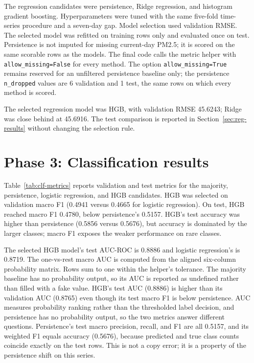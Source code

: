 The regression candidates were persistence, Ridge regression, and histogram gradient boosting. Hyperparameters were tuned with the same five-fold time-series procedure and a seven-day gap. Model selection used validation RMSE. The selected model was refitted on training rows only and evaluated once on test. Persistence is not imputed for missing current-day PM2.5; it is scored on the same scorable rows as the models. The final code calls the metric helper with \texttt{allow\_missing=False} for every method. The option \texttt{allow\_missing=True} remains reserved for an unfiltered persistence baseline only; the persistence \texttt{n\_dropped} values are 6 validation and 1 test, the same rows on which every method is scored.

The selected regression model was HGB, with validation RMSE 45.6243; Ridge was close behind at 45.6916. The test comparison is reported in Section~\ref{sec:reg-results} without changing the selection rule.

\section{Phase 3: Classification results}
\label{sec:clf-results}

Table~\ref{tab:clf-metrics} reports validation and test metrics for the majority, persistence, logistic regression, and HGB candidates. HGB was selected on validation macro F1 (0.4941 versus 0.4665 for logistic regression). On test, HGB reached macro F1 0.4780, below persistence's 0.5157. HGB's test accuracy was higher than persistence (0.5856 versus 0.5676), but accuracy is dominated by the larger classes; macro F1 exposes the weaker performance on rare classes.



The selected HGB model's test AUC-ROC is 0.8886 and logistic regression's is 0.8719. The one-vs-rest macro AUC is computed from the aligned six-column probability matrix. Rows sum to one within the helper's tolerance. The majority baseline has no probability output, so its AUC is reported as undefined rather than filled with a fake value. HGB's test AUC (0.8886) is higher than its validation AUC (0.8765) even though its test macro F1 is below persistence. AUC measures probability ranking rather than the thresholded label decision, and persistence has no probability output, so the two metrics answer different questions. Persistence's test macro precision, recall, and F1 are all 0.5157, and its weighted F1 equals accuracy (0.5676), because predicted and true class counts coincide exactly on the test rows. This is not a copy error; it is a property of the persistence shift on this series.

